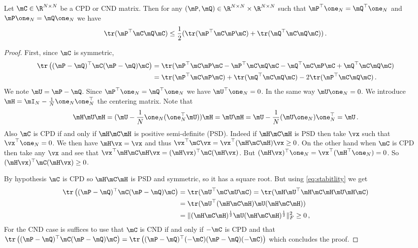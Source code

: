 \begin{lemma}
	\label{ineq:lemma}
	Let $\mC \in \R^{N \times N}$ be a CPD or CND matrix. Then for any  $(\mP, \mQ) \in \R^{N \times N} \times \R^{N \times N}$ such that $\mP^\top \one_N = \mQ^\top \one_N$ and $\mP \one_N = \mQ \one_N$ we have
	\begin{equation}
		\tr(\mP^\top \mC \mQ \mC) \leq \frac{1}{2}(\tr(\mP^\top \mC \mP \mC)+\tr(\mQ^\top \mC \mQ \mC))\,.
	\end{equation}
\end{lemma}
\begin{proof}
	First, since $\mC$ is symmetric,
	\begin{equation}
		\begin{split}
			\tr\left((\mP-\mQ)^\top \mC (\mP-\mQ)\mC\right) &= \tr(\mP^\top \mC \mP \mC- \mP^\top \mC \mQ \mC- \mQ^\top \mC \mP \mC +\mQ^\top \mC \mQ \mC ) \\
			&=\tr(\mP^\top \mC \mP \mC) + \tr(\mQ^\top \mC \mQ \mC) -2 \tr(\mP^\top \mC \mQ \mC)\,.
		\end{split}
	\end{equation}
	We note $\mU = \mP- \mQ$. Since $\mP^\top \one_N = \mQ^\top \one_N$ we have $\mU^\top \one_N = 0$. In the same way $\mU \one_N = 0$. We introduce $\mH = \mI_N - \frac{1}{N} \one_N \one_N^\top$ the  centering matrix. Note that 
	\begin{equation}
		\label{eq:stabitlity}
		\mH \mU \mH = (\mU - \frac{1}{N} \one_N (\one_N^\top\mU))\mH = \mU \mH = \mU -\frac{1}{N} (\mU \one_N) \one_N^\top = \mU\,.
	\end{equation}
	Also $\mC$ is CPD if and only if $\mH \mC \mH$ is positive semi-definite (PSD). Indeed if $\mH \mC \mH$ is PSD then take $\vx$ such that $\vx^\top \one_N = 0$. We then have $\mH \vx = \vx$ and thus $\vx^\top \mC \vx = \vx^\top (\mH \mC \mH) \vx \geq 0$. On the other hand when $\mC$ is CPD then take any $\vx$ and see that $\vx^\top \mH \mC \mH \vx = (\mH \vx)^\top \mC (\mH \vx)$. But $(\mH \vx)^\top \one_N= \vx^\top (\mH^\top \one_N) = 0$. So $(\mH \vx)^\top \mC (\mH \vx) \geq 0$.
	
	By hypothesis $\mC$ is CPD so $\mH \mC \mH$ is PSD and symmetric, so it has a square root. But using \cref{eq:stabitlity} we get
	\begin{equation}
		\begin{split}
			\tr\left((\mP-\mQ)^\top \mC (\mP-\mQ)\mC\right) & = \tr(\mU^\top \mC \mU \mC) = \tr(\mH\mU^\top \mH \mC \mH \mU \mH \mC) \\
			&=\tr(\mU^\top (\mH \mC \mH) \mU (\mH \mC \mH))\\
			&=\|(\mH \mC \mH)^{\frac{1}{2}} \mU (\mH \mC \mH)^{\frac{1}{2}}\|_F^2 \geq 0\,,
		\end{split}
	\end{equation}
	For the CND case is suffices to use that $\mC$ is CND if and only if $-\mC$ is CPD and that $\tr\left((\mP-\mQ)^\top \mC (\mP-\mQ)\mC\right)= \tr\left((\mP-\mQ)^\top (-\mC) (\mP-\mQ)(-\mC)\right)$ which concludes the proof. 
\end{proof}


